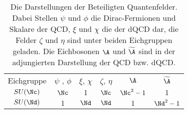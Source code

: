 \begin{table}
\centering
\begin{tabular}{c|ccccc}
 Eichgruppe	& $\psi$	, $\phi$	&$\xi$, $\chi$	&$\zeta$, $\eta$ & $\A$ & $\widetilde{\A}$ 
 \\
 $SU(\Nc)$	& $\Nc$	& $1$ &$\Nc$ & $\Nc^2-1$ & $1$ \\ 
 $SU(\Nd)$	& $1$	& $\Nd$ &$\Nd$ & $1$ & $\Nd^2-1$ \\
\end{tabular}
\caption{Die Darstellungen der Beteiligten Quantenfelder. Dabei Stellen 
$\psi$ und $\phi$ die Dirac-Fermionen und Skalare der QCD, 
$\xi$ und $\chi$ die der dQCD dar, die Felder $\zeta$ und $\eta$ sind unter beiden 
Eichgruppen geladen. Die Eichbosonen $\A$ und $\widetilde{\A}$ sind in der 
adjungierten Darstellung der QCD bzw. dQCD.}
\end{table}